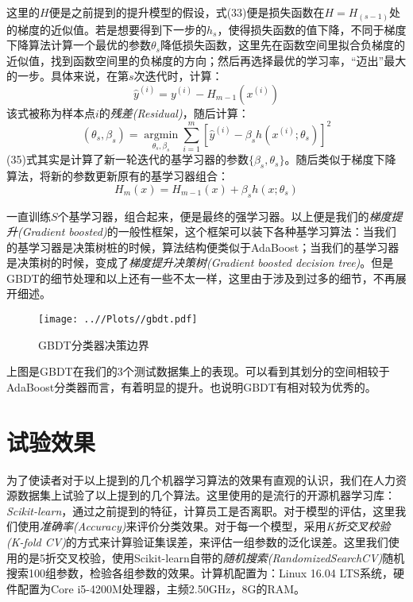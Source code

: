 \documentclass[UTF8, 12pt]{ctexart}
\begin{document}
这里的$H$便是之前提到的提升模型的假设，式(33)便是损失函数在$H=H_(s-1)$处的梯度的近似值。若是想要得到下一步的$h_{s}$，使得损失函数的值下降，不同于梯度下降算法计算一个最优的参数$\theta_{s}$降低损失函数，这里先在函数空间里拟合负梯度的近似值，找到函数空间里的负梯度的方向；然后再选择最优的学习率，“迈出”最大的一步。具体来说，在第$s$次迭代时，计算：
\begin{equation}
	{\hat{y}}^{(i)} = y^{(i)} - H_{m-1}(x^{(i)})
\end{equation}
该式被称为样本点$i$的\emph{残差(Residual)}，随后计算：
\begin{equation}
	(\theta_s,\beta_{s}) = \operatorname*{argmin}\limits_{\theta_s,\beta_{s}} \sum_{i=1}^{m}[{\hat{y}}^{(i)} - \beta_{s}h(x^{(i)};\theta_{s})]^2
\end{equation}
(35)式其实是计算了新一轮迭代的基学习器的参数$\{\beta_{s}, \theta_{s}\}$。随后类似于梯度下降算法，将新的参数更新原有的基学习器组合：
\begin{equation}
	H_{m}(x) = H_{m-1}(x) + \beta_{s}h(x;\theta_{s})
\end{equation}

一直训练$S$个基学习器，组合起来，便是最终的强学习器。以上便是我们的\emph{梯度提升(Gradient boosted)}的一般性框架，这个框架可以装下各种基学习算法：当我们的基学习器是决策树桩的时候，算法结构便类似于AdaBoost；当我们的基学习器是决策树的时候，变成了\emph{梯度提升决策树(Gradient boosted decision tree)}。但是GBDT的细节处理和以上还有一些不太一样，这里由于涉及到过多的细节，不再展开细述。

\begin{figure}[H]
	\centering
	\texttt{[image: ..//Plots//gbdt.pdf]}
	\caption{GBDT分类器决策边界}
	\label{Fig:10}
	\vspace{-0.5em}
\end{figure}

上图是GBDT在我们的3个测试数据集上的表现。可以看到其划分的空间相较于AdaBoost分类器而言，有着明显的提升。也说明GBDT有相对较为优秀的。

\section{试验效果}
为了使读者对于以上提到的几个机器学习算法的效果有直观的认识，我们在人力资源数据集上试验了以上提到的几个算法。这里使用的是流行的开源机器学习库：\emph{Scikit-learn}，通过之前提到的特征，计算员工是否离职。对于模型的评估，这里我们使用\emph{准确率(Accuracy)}来评价分类效果。对于每一个模型，采用\emph{K折交叉校验(K-fold CV)}的方式来计算验证集误差，来评估一组参数的泛化误差。这里我们使用的是5折交叉校验，使用Scikit-learn自带的\emph{随机搜索(RandomizedSearchCV)}随机搜索100组参数，检验各组参数的效果。计算机配置为：Linux 16.04 LTS系统，硬件配置为Core i5-4200M处理器，主频2.50GHz，8G的RAM。
\end{document}
